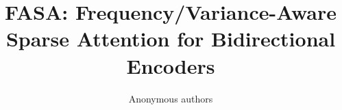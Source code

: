 \title{\textbf{FASA: Frequency/Variance-Aware Sparse Attention for Bidirectional Encoders}}

\author{Anonymous authors}

